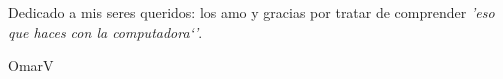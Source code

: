 \begin{center}
Dedicado a mis seres queridos: los amo y gracias por tratar de comprender \textit{'eso que haces con la computadora`'}.
\end{center}
\vspace{8cm}
\begin{flushright}
    OmarV
\end{flushright}